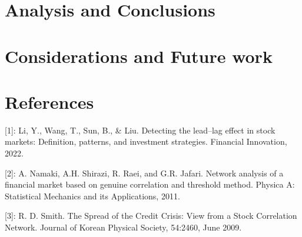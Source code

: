 \documentclass{article}
\begin{document}
\section{Analysis and Conclusions}
\section{Considerations and Future work}
\section*{References}
[1]: Li, Y., Wang, T., Sun, B., \& Liu. Detecting the lead–lag effect in stock markets: Definition, patterns, and investment strategies. Financial Innovation, 2022.

[2]: A. Namaki, A.H. Shirazi, R. Raei, and G.R. Jafari. Network analysis of a financial market based on genuine correlation and threshold method. Physica A: Statistical
Mechanics and its Applications, 2011.

[3]: R. D. Smith. The Spread of the Credit Crisis: View
from a Stock Correlation Network. Journal of Korean
Physical Society, 54:2460, June 2009.

\medskip
\small
\end{document}
